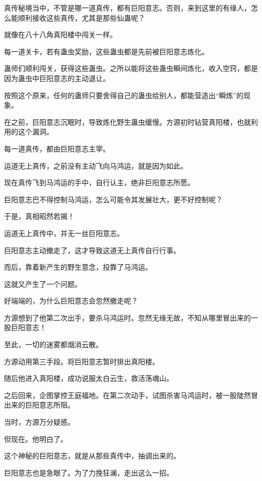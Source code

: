 
\begin{this_body}



真传秘境当中，不管是哪一道真传，都有巨阳意志。否则，来到这里的有缘人，怎么能顺利接收这些真传，尤其是那些仙蛊呢？

就像在八十八角真阳楼中闯关一样。

每一道关卡，若有蛊虫奖励，这些蛊虫都是先前被巨阳意志炼化。

蛊师们顺利闯关，获得这些蛊虫。之所以能将这些蛊虫瞬间炼化，收入空窍，都是因为蛊虫中巨阳意志的主动退让。

按照这个原来，任何的蛊师只要舍得自己的蛊虫给别人，都能营造出“瞬炼”的现象。

在之前，巨阳意志沉眠时，导致炼化野生蛊虫缓慢。方源初时钻营真阳楼，也就利用的这个漏洞。

每一道真传，都由巨阳意志主宰。

运道无上真传，之前没有主动飞向马鸿运，就是因为如此。

现在真传飞到马鸿运的手中，自行认主，绝非巨阳意志所愿。

巨阳意志巴不得控制马鸿运，怎么可能令其发展壮大，更不好控制呢？

于是，真相昭然若揭！

运道无上真传中，并无一丝巨阳意志。

巨阳意志主动撤走了，这才导致这道无上真传自行行事。

而后，靠着新产生的野生意念，投靠了马鸿运。

这就又产生了一个问题。

好端端的，为什么巨阳意志会忽然撤走呢？

方源想到了他第二次出手，要杀马鸿运时。忽然无缘无故，不知从哪里冒出来的一股巨阳意志！

至此，一切的迷雾都烟消云散。

方源动用第三手段。将巨阳意志暂时排出真阳楼。

随后他进入真阳楼，成功说服太白云生，救活荡魂山。

之后回来，企图掌控王庭福地。在第二次动手，试图杀害马鸿运时，被一股陡然冒出来的巨阳意志所阻。

当时，方源万分疑惑。

但现在。他明白了。

这个神秘的巨阳意志，就是从那些真传中，抽调出来的。

巨阳意志也是急眼了。为了力挽狂澜，走出这么一招。


\end{this_body}
